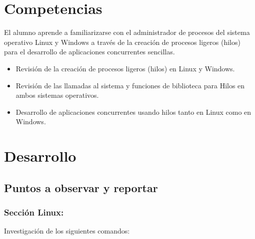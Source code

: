 \documentclass[12pt]{article}
\begin{document}
	\tableofcontents
	\newpage
	
	

	\section{Competencias}
        El alumno aprende a familiarizarse con el administrador de procesos del sistema operativo Linux y Windows a través de la creación de procesos ligeros (hilos) para el desarrollo de aplicaciones concurrentes sencillas.
        
        \begin{itemize}
            \item Revisión de la creación de procesos ligeros (hilos) en Linux y Windows.
            \item Revisión de las llamadas al sistema y funciones de biblioteca para Hilos en ambos sistemas operativos.
            \item Desarrollo de aplicaciones concurrentes usando hilos tanto en Linux como en Windows.
        \end{itemize}
	
    \section{Desarrollo}
    \subsection{Puntos a observar y reportar}
    
            
        
        
        \subsubsection{Sección Linux:}
        Investigación de los siguientes comandos:
        
\end{document}
